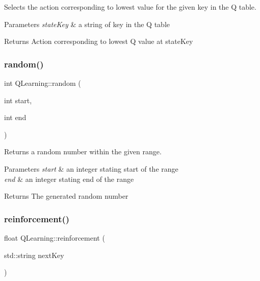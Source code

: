Selects the action corresponding to lowest value for the given key in the Q table. 


\begin{DoxyParams}{Parameters}
{\em state\+Key} & a string of key in the Q table \\
\hline
\end{DoxyParams}
\begin{DoxyReturn}{Returns}
Action corresponding to lowest Q value at state\+Key 
\end{DoxyReturn}
\mbox{\label{classQLearning_adc9c1b48116868a468ec370cc2dc3475}} 
\subsubsection{\texorpdfstring{random()}{random()}}
{\footnotesize\ttfamily int Q\+Learning\+::random (\begin{DoxyParamCaption}\item[{int}]{start,  }\item[{int}]{end }\end{DoxyParamCaption})}



Returns a random number within the given range. 


\begin{DoxyParams}{Parameters}
{\em start} & an integer stating start of the range \\
\hline
{\em end} & an integer stating end of the range \\
\hline
\end{DoxyParams}
\begin{DoxyReturn}{Returns}
The generated random number 
\end{DoxyReturn}
\mbox{\label{classQLearning_acb9b1ecb8b84f0b8b3cf8acb809fe7c3}} 
\subsubsection{\texorpdfstring{reinforcement()}{reinforcement()}}
{\footnotesize\ttfamily float Q\+Learning\+::reinforcement (\begin{DoxyParamCaption}\item[{std\+::string}]{next\+Key }\end{DoxyParamCaption})}




